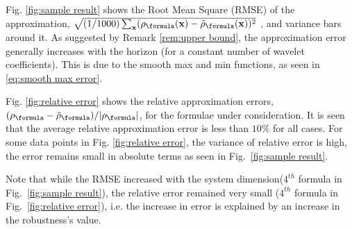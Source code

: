 Fig. \ref{fig:sample result} shows the Root Mean Square (RMSE) of the approximation, $\sqrt{(1/1000)\sum_{\sstraj}(\robf(\sstraj)-\srobf(\sstraj))^2}$
, and variance bars around it.
As suggested by Remark \ref{rem:upper bound}, the approximation error generally increases with the horizon (for a constant number of wavelet coefficients).
This is due to the smooth max and min functions, as seen in \eqref{eq:smooth max error}.

Fig. \ref{fig:relative error} shows the relative approximation errors, $(\robf-\srobf)/|\robf|$, for the formulae under consideration. 
It is seen that the average relative approximation error is less than $10\%$ for all cases. 
For some data points in Fig. \ref{fig:relative error}, the variance of relative error is high, the error remains small in absolute terms as seen in Fig.~\ref{fig:sample result}.




Note that while the RMSE  increased with the system dimension($4^{th}$ formula in Fig.~\ref{fig:sample result}), the relative error remained very small ($4^{th}$ formula in Fig.~\ref{fig:relative error}), i.e. the increase in error is explained by an increase in the robustness's value. 

